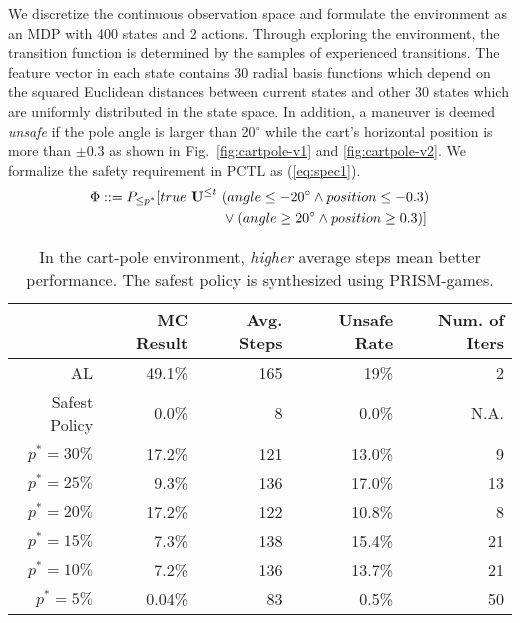{We discretize the continuous observation space and formulate the environment as an MDP with 400 states and 2 actions. Through exploring the environment, the transition function is determined by the samples of experienced transitions. The feature vector in each state contains $30$ radial basis functions which depend on the squared Euclidean distances between current states and other $30$ states which are uniformly distributed in the state space. In addition, a maneuver is deemed {\it unsafe} if the pole angle is larger than 20$^\circ$ while the cart's horizontal position is more than $\pm 0.3$ as shown in Fig.~\ref{fig:cartpole-v1} and \ref{fig:cartpole-v2}. We formalize the safety requirement in PCTL as (\ref{eq:spec1}).
\begin{equation}
\begin{split}
\Phi ::= P_{\leq p^*}[true\ {\textbf{U}}^{\leq t}\ &(angle\leq -20^\circ\wedge position\leq-0.3)\\
&\vee(angle\geq 20^\circ\wedge position\geq 0.3)]
\end{split}
\label{eq:spec1}
\end{equation}

\begin{table}[htb]
\begin{center}
\caption{In the cart-pole environment, {\it higher} average steps mean better performance. The safest policy is synthesized using PRISM-games.}
\begin{tabular}{|r|r|r|r|r|}
\hline
  &\small{\ \ MC Result} &\small{\ \ Avg. Steps}  &\small{\ \ Unsafe Rate} &\small{\ \ Num. of Iters}\\
\hline
AL &49.1\%& 165 &  19\% & 2\\
\hline
Safest Policy  & 0.0\% & 8 & 0.0\% & N.A.\\
\hline
$p^*=30\%$ & 17.2\%  & 121 & 13.0\% & 9\\
\hline
$p^*=25\%$ & 9.3\%  & 136 & 17.0\% & 13\\
\hline
$p^*=20\%$ & 17.2\% & 122 & 10.8\% & 8\\
\hline
$p^*=15\%$ & 7.3\% & 138 & 15.4\% & 21\\
\hline
$p^*=10\%$ & 7.2\% & 136 & 13.7\% & 21\\
\hline
$p^*=5\%$ & 0.04\% & 83 & 0.5\% & 50\\
\hline
\end{tabular}
\label{tab:cartpole1}
\end{center}
\end{table}

}
